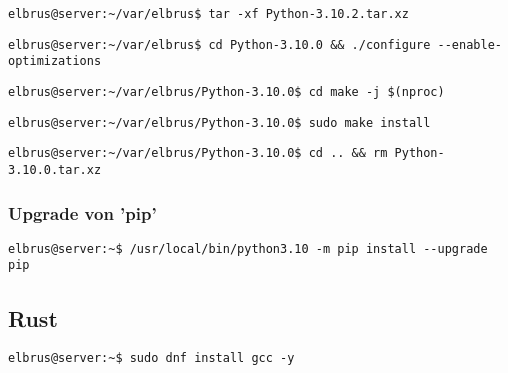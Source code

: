 \documentclass{article}
\begin{document}
	\begin{lstlisting}[caption={Extrahieren der installierten Datei.}]
		elbrus@server:~/var/elbrus$ tar -xf Python-3.10.2.tar.xz
	\end{lstlisting}
	
	\begin{lstlisting}[caption={Wechseln zu source Verzeichniss. Und ausführen des Konfigurations Scripts.}]
		elbrus@server:~/var/elbrus$ cd Python-3.10.0 && ./configure --enable-optimizations
	\end{lstlisting}

	\begin{lstlisting}[caption={Starten des build Prozesses.}]
		elbrus@server:~/var/elbrus/Python-3.10.0$ cd make -j $(nproc)
	\end{lstlisting}
	
	\begin{lstlisting}[caption={Installieren von Python.}]
		elbrus@server:~/var/elbrus/Python-3.10.0$ sudo make install
	\end{lstlisting}

	\begin{lstlisting}[caption={Löschen der kompremierten Python Datei.}]
		elbrus@server:~/var/elbrus/Python-3.10.0$ cd .. && rm Python-3.10.0.tar.xz
	\end{lstlisting}

	
	\subsubsection{Upgrade von 'pip'}
	\begin{lstlisting}[caption={Upgraden von 'pip'.}]
		elbrus@server:~$ /usr/local/bin/python3.10 -m pip install --upgrade pip
	\end{lstlisting}

	\subsection{Rust}
	
	\begin{lstlisting}[caption={Installieren von GNU Compiler Collection.}]
		elbrus@server:~$ sudo dnf install gcc -y
	\end{lstlisting}
	
\end{document}
